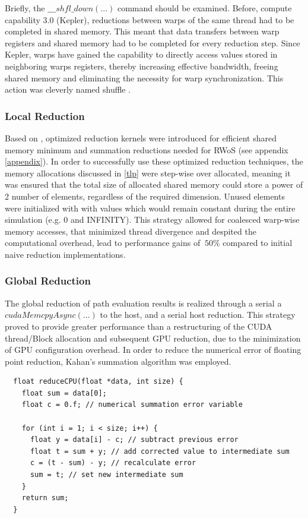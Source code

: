 Briefly, the $\_\_\_shfl\_down(...)$ command should be examined. Before, compute capability
3.0 (Kepler), reductions between warps of the same thread had to be completed in
shared memory.  This meant that data transfers between warp registers and shared
memory had to be completed for every reduction step.  Since Kepler, warps have gained
the capability to directly access values stored in neighboring warps registers,
thereby increasing effective bandwidth, freeing shared memory and eliminating the
necessity for warp synchronization. This action was cleverly named shuffle \cite{shuffle}.
\subsubsection{Local Reduction}\label{localRed}
Based on \cite{harris}, optimized reduction kernels were introduced for efficient
shared memory minimum and summation reductions needed for \Gls{RWoS} (see appendix \ref{appendix}).
In order to successfully use these optimized reduction techniques, the memory allocations
discussed in \ref{tlp} were step-wise over allocated, meaning it was ensured that
the total size of allocated shared memory could store a power of 2 number of elements,
regardless of the required dimension.  Unused elements were initialized with with
values which would remain constant during the entire simulation (e.g. 0 and INFINITY).
This strategy allowed for coalesced warp-wise memory accesses, that minimized
thread divergence and despited the computational overhead, lead to performance gains
of $~50\%$ compared to initial naive reduction implementations.
\subsubsection{Global Reduction}
The global reduction of path evaluation results is realized through a serial
a $cudaMemcpyAsync(...)$ to the host, and a serial host reduction.  This strategy
proved to provide greater performance than a restructuring of the CUDA thread/Block
allocation and subsequent GPU reduction, due to the minimization of GPU configuration
overhead.  In order to reduce the numerical error of floating point reduction,
Kahan's summation algorithm was employed.
\begin{lstlisting}
  float reduceCPU(float *data, int size) {
    float sum = data[0];
    float c = 0.f; // numerical summation error variable

    for (int i = 1; i < size; i++) {
      float y = data[i] - c; // subtract previous error
      float t = sum + y; // add corrected value to intermediate sum
      c = (t - sum) - y; // recalculate error
      sum = t; // set new intermediate sum
    }
    return sum;
  }
\end{lstlisting}


